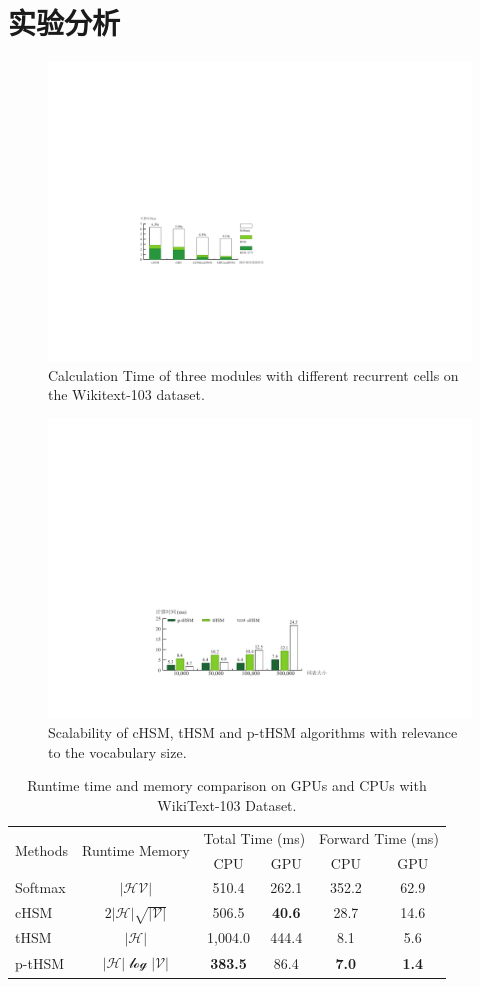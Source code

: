 \section{实验分析}
\begin{figure}
  \centering
  \includegraphics[width=0.6\columnwidth]{./figures/rnn_timing.pdf}
  \caption{Calculation Time of three modules with different recurrent cells on the Wikitext-103 dataset.}\label{fig:rnn_timing}
\end{figure}
\begin{figure}
  \centering
  \includegraphics[width=0.6\columnwidth]{./figures/all_time.pdf}
  \caption{Scalability of cHSM, tHSM and p-tHSM algorithms with relevance to the vocabulary size.}\label{fig:hsm_benchmark}
\end{figure}
\begin{table}[!t]
  \centering
  \caption{Runtime time and memory comparison on GPUs and CPUs with WikiText-103 Dataset.\label{tab:time}}
\begin{tabular}{lccccc}
  \toprule
 \multirow{2}{*}{Methods}  &\multirow{2}{*}{Runtime Memory} &\multicolumn{2}{c}{Total Time (ms)} & \multicolumn{2}{c}{Forward Time (ms)}   \\
   \cmidrule(lr){3-4}  \cmidrule(lr){5-6}
	& & CPU&GPU & CPU& GPU \\ \midrule
Softmax & $\mathcal{|HV|}$ &510.4  &262.1&352.2& 62.9 \\
cHSM    & $2\mathcal{|H|\sqrt{|V|}}$&506.5  &\textbf{40.6}&28.7&14.6 \\
tHSM    &$\mathcal{|H|}$&1,004.0 &444.4 & 8.1&  5.6   \\
p-tHSM  &$\mathcal{|H|\log{|V|}}$ &\textbf{383.5}&	86.4 &\textbf{7.0}&	\textbf{1.4} \\
  \bottomrule
\end{tabular}
\end{table}


